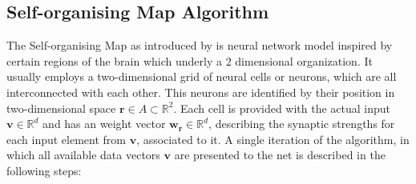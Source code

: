 \documentclass[cic,tc,english]{iiufrgs}
\begin{document}
\subsection{Self-organising Map Algorithm}
The Self-organising Map as introduced by \cite{kohonen2012self} is neural network model inspired by certain regions of the brain which underly a 2 dimensional organization. It usually employs a two-dimensional grid of neural cells or neurons, which are all interconnected with each other. This neurons are identified by their position in two-dimensional space $\bm{r} \in A \subset \mathbb{R}^2$. Each cell is provided with the actual input $\bm{v} \in \mathbb{R}^d$ and has an weight vector $\bm{w_r} \in \mathbb{R}^d$, describing the synaptic strengths for each input element from $\bm{v}$, associated to it. A single iteration of the algorithm, in which all available data vectors $\bm{v}$ are presented to the net is described in the following steps:
\end{document}
